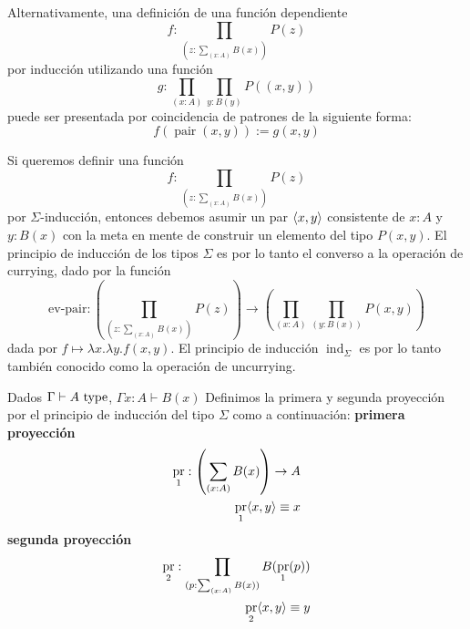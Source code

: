 \documentclass{article}
\DeclareMathOperator{\ind}{ind}
\DeclareMathOperator{\pair}{pair}
\DeclareMathOperator{\pr}{pr}
\begin{document}
    \begin{remark}
        Alternativamente, una definición de una función dependiente
        $$
            f : \prod_{(z : \sum_{(x : A)} B(x))} P(z)
        $$
        por inducción utilizando una función
        $$
            g : \prod_{(x : A)} \prod_{y : B(y)}P((x, y))
        $$
        puede ser presentada por coincidencia de patrones de la siguiente forma:
        $$
            f(\pair(x,y)) := g(x,y)
        $$
    \end{remark}

    \begin{remark}
         Si queremos definir una función
         $$
            f : \prod_{(z : \sum_{(x : A)} B(x))} P(z)
         $$
         por $\Sigma$-inducción, entonces debemos asumir un par $\langle x, y \rangle$
         consistente de $x : A$ y $y : B(x)$ con la meta en mente de construir
         un elemento del tipo $P(x,y)$. El principio de inducción de los tipos
         $\Sigma$ es por lo tanto el converso a la operación de currying, dado
         por la función
         $$
            \text{ev-pair} : \left(
                \prod_{(z : \sum_{(x : A)} B(x))} P(z)
            \right)
            \rightarrow
            \left(
                \prod_{(x : A)}\prod_{(y : B(x))} P(x, y)
            \right)
         $$
         dada por $f \mapsto \lambda x. \lambda y . f(x, y )$. El principio de
         inducción $\ind_\Sigma$ es por lo tanto también conocido como la
         operación de uncurrying.
    \end{remark}
    
    \begin{definition}
        Dados $\Gamma \vdash A\ \mathrm{type}$, $\Gamma x : A \vdash B(x)$
        Definimos la primera y segunda proyección por el principio de inducción
        del tipo $\Sigma$ como a continuación:
        \hfill\newline\textbf{primera proyección}\hfill\newline
        \begin{align*}
            \pr_1 : \left(\sum_{(x : A)} B(x)\right) \rightarrow A\\
            \pr_1\picopar{x,y} \equiv x
        \end{align*}
        \hfill\newline\textbf{segunda proyección}\hfill\newline
        \begin{align*}
            \pr_2 : \prod_{(p : \sum_{(x : A)} B(x))} B(\pr_1(p))\\
            \pr_2\picopar{x,y} \equiv y
        \end{align*}
    \end{definition}
\end{document}
